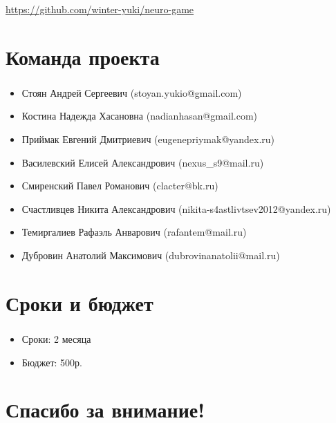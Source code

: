 \documentclass[c]{beamer}  %
\begin{document}
    

\begin{frame}
    
    \vspace{2ex}
    
    \vspace{2ex}
    \url{https://github.com/winter-yuki/neuro-game} 
\end{frame}


\section{Команда проекта}

\begin{frame}
\frametitle{\insertsection} 
\begin{itemize}
    \item Стоян Андрей Сергеевич (stoyan.yukio@gmail.com)
    \item Костина Надежда Хасановна (nadianhasan@gmail.com)
    \item Приймак Евгений Дмитриевич (eugenepriymak@yandex.ru)
    \item Василевский Елисей Александрович (nexus\_s9@mail.ru)
    \item Смиренский Павел Романович (clacter@bk.ru)
    \item Счастливцев Никита Александрович (nikita-s4astlivtsev2012@yandex.ru)
    \item Темиргалиев Рафаэль Анварович (rafantem@mail.ru)
    \item Дубровин Анатолий Максимович (dubrovinanatolii@mail.ru)
\end{itemize}
\end{frame}










\section{Сроки и бюджет}

\begin{frame}
\frametitle{\insertsection} 
\framesubtitle{\insertsubsection}
\begin{itemize}
    \item Сроки: 2 месяца
    \item Бюджет: 500р.
\end{itemize}
\end{frame}


\section{Спасибо за внимание!}

\begin{frame}
\end{frame}
\end{document}

